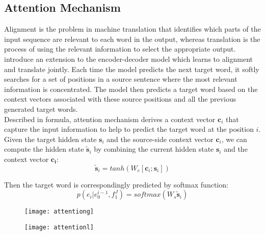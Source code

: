 \subsection{Attention Mechanism}
Alignment is the problem in machine translation that identifies which parts of the input sequence are relevant to each word in the output, whereas translation is the process of using the relevant information to select the appropriate output.
\cite{bahdanau2014neural} introduce an extension to the encoder-decoder model which learns to alignment and translate jointly. Each time the model predicts the next target word, it softly searches for a set of positions in a source sentence where the most relevant information is concentrated. The model then predicts a target word based on the context vectors associated with these source positions and all the previous generated target words.\\
Described in formula, attention mechanism derives a context vector ${\bm{c}_i}$ that capture the input information to help to predict the target word at the position ${i}$. Given the target hidden state ${\bm{s}_i}$ and the source-side context vector $\bm{c}_i$, we can compute the hidden state ${\tilde{\bm{s}}_i}$ by combining the current hidden state $\bm{s}_i$ and the context vector $\bm{c_i}$:
\[ \tilde{\bm{s}}_i = tanh(W_c[\bm{c}_i; \bm{s}_i])\]

Then the target word is correspondingly predicted by softmax function:
\[  p(e_i|e_0^{i-1}, f_1^J) = softmax(W_s \tilde{\bm{s}}_i)\] 
%	
\begin{figure}
	\centering
	\begin{minipage}{.5\textwidth}
		\centering
		\texttt{[image: attentiong]}
		\label{fig:test1}
	\end{minipage}%
	\begin{minipage}{.5\textwidth}
		\centering
		\texttt{[image: attentionl]}
		\label{fig:test2}
	\end{minipage}
\end{figure}
%


